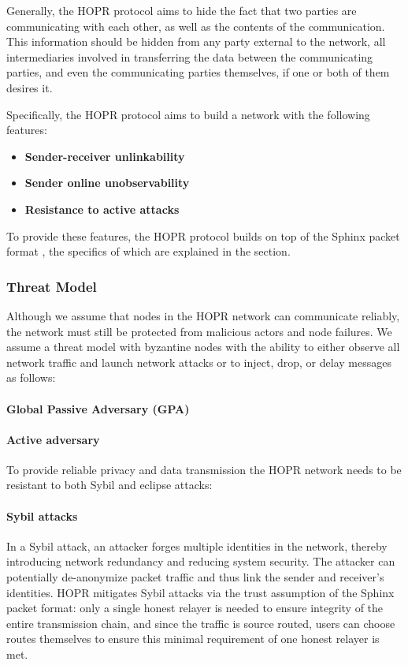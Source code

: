 Generally, the HOPR protocol aims to hide the fact that two parties are communicating with each other, as well as the contents of the communication. This information should be hidden from any party external to the network, all intermediaries involved in transferring the data between the communicating parties, and even the communicating parties themselves, if one or both of them desires it.

Specifically, the HOPR protocol aims to build a network with the following features:

\begin{itemize}

    \item \textbf{Sender-receiver unlinkability}


    \item \textbf{Sender online unobservability}


    \item \textbf{Resistance to active attacks}

\end{itemize}
To provide these features, the HOPR protocol builds on top of the Sphinx packet format \cite{sphinxpaper}, the specifics of which are explained in the  section.


\subsubsection{Threat Model}

Although we assume that nodes in the HOPR network can communicate reliably, the network must still be protected from malicious actors and node failures. We assume a threat model with byzantine nodes with the ability to either observe all network traffic and launch network attacks or to inject, drop, or delay messages as follows:

\paragraph{Global Passive Adversary (GPA)}

\paragraph{Active adversary}

To provide reliable privacy and data transmission the HOPR network needs to be resistant to both Sybil and eclipse attacks:

\paragraph{Sybil attacks}
In a Sybil attack, an attacker forges multiple identities in the network, thereby introducing network redundancy and reducing system security. The attacker can potentially de-anonymize packet traffic and thus link the sender and receiver's identities. HOPR mitigates Sybil attacks via the trust assumption of the Sphinx packet format: only a single honest relayer is needed to ensure integrity of the entire transmission chain, and since the traffic is source routed, users can choose routes themselves to ensure this minimal requirement of one honest relayer is met.

